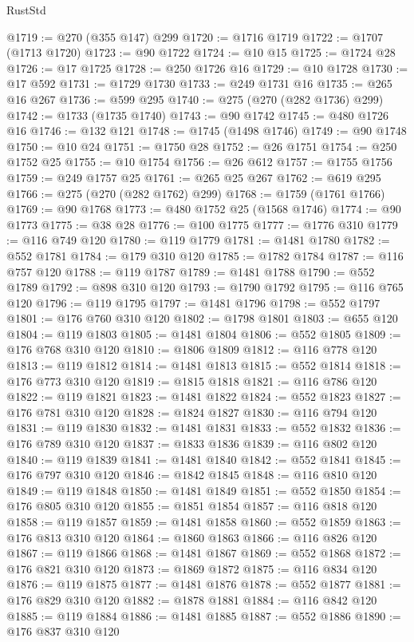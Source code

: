 \begin{lexlean}{RustStd}
\begin{coremodule}
@1719 := @270 (@355 @147) @299
@1720 := @1716 @1719
@1722 := @1707 (@1713 @1720)
@1723 := @90 @1722
@1724 := @10 @15
@1725 := @1724 @28
@1726 := @17 @1725
@1728 := @250 @1726 @16
@1729 := @10 @1728
@1730 := @17 @592
@1731 := @1729 @1730
@1733 := @249 @1731 @16
@1735 := @265 @16 @267
@1736 := @599 @295
@1740 := @275 (@270 (@282 @1736) @299)
@1742 := @1733 (@1735 @1740)
@1743 := @90 @1742
@1745 := @480 @1726 @16
@1746 := @132 @121
@1748 := @1745 (@1498 @1746)
@1749 := @90 @1748
@1750 := @10 @24
@1751 := @1750 @28
@1752 := @26 @1751
@1754 := @250 @1752 @25
@1755 := @10 @1754
@1756 := @26 @612
@1757 := @1755 @1756
@1759 := @249 @1757 @25
@1761 := @265 @25 @267
@1762 := @619 @295
@1766 := @275 (@270 (@282 @1762) @299)
@1768 := @1759 (@1761 @1766)
@1769 := @90 @1768
@1773 := @480 @1752 @25 (@1568 @1746)
@1774 := @90 @1773
@1775 := @38 @28
@1776 := @100 @1775
@1777 := @1776 @310
@1779 := @116 @749 @120
@1780 := @119 @1779
@1781 := @1481 @1780
@1782 := @552 @1781
@1784 := @179 @310 @120
@1785 := @1782 @1784
@1787 := @116 @757 @120
@1788 := @119 @1787
@1789 := @1481 @1788
@1790 := @552 @1789
@1792 := @898 @310 @120
@1793 := @1790 @1792
@1795 := @116 @765 @120
@1796 := @119 @1795
@1797 := @1481 @1796
@1798 := @552 @1797
@1801 := @176 @760 @310 @120
@1802 := @1798 @1801
@1803 := @655 @120
@1804 := @119 @1803
@1805 := @1481 @1804
@1806 := @552 @1805
@1809 := @176 @768 @310 @120
@1810 := @1806 @1809
@1812 := @116 @778 @120
@1813 := @119 @1812
@1814 := @1481 @1813
@1815 := @552 @1814
@1818 := @176 @773 @310 @120
@1819 := @1815 @1818
@1821 := @116 @786 @120
@1822 := @119 @1821
@1823 := @1481 @1822
@1824 := @552 @1823
@1827 := @176 @781 @310 @120
@1828 := @1824 @1827
@1830 := @116 @794 @120
@1831 := @119 @1830
@1832 := @1481 @1831
@1833 := @552 @1832
@1836 := @176 @789 @310 @120
@1837 := @1833 @1836
@1839 := @116 @802 @120
@1840 := @119 @1839
@1841 := @1481 @1840
@1842 := @552 @1841
@1845 := @176 @797 @310 @120
@1846 := @1842 @1845
@1848 := @116 @810 @120
@1849 := @119 @1848
@1850 := @1481 @1849
@1851 := @552 @1850
@1854 := @176 @805 @310 @120
@1855 := @1851 @1854
@1857 := @116 @818 @120
@1858 := @119 @1857
@1859 := @1481 @1858
@1860 := @552 @1859
@1863 := @176 @813 @310 @120
@1864 := @1860 @1863
@1866 := @116 @826 @120
@1867 := @119 @1866
@1868 := @1481 @1867
@1869 := @552 @1868
@1872 := @176 @821 @310 @120
@1873 := @1869 @1872
@1875 := @116 @834 @120
@1876 := @119 @1875
@1877 := @1481 @1876
@1878 := @552 @1877
@1881 := @176 @829 @310 @120
@1882 := @1878 @1881
@1884 := @116 @842 @120
@1885 := @119 @1884
@1886 := @1481 @1885
@1887 := @552 @1886
@1890 := @176 @837 @310 @120

\end{coremodule}
\end{lexlean}
